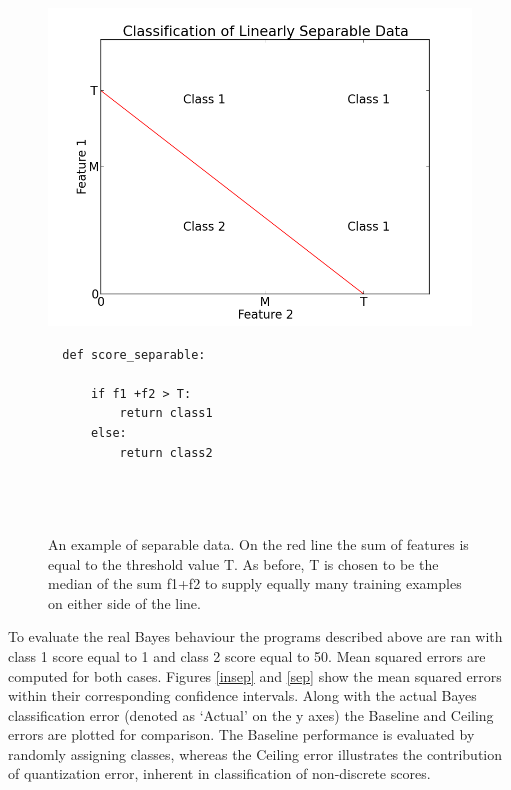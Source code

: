\documentclass[12pt,notitlepage,twoside]{scrreprt}
\begin{document}
\begin{figure}[h!]
\begin{minipage}[b]{0.55\linewidth}
  \includegraphics[width=1.2\linewidth]{figs/gen_sep.png}
\end{minipage}
\hspace{0.5cm}
\begin{minipage}[b]{0.4\linewidth}
\begin{verbatim}
  def score_separable:

      if f1 +f2 > T:
          return class1
      else:
          return class2




\end{verbatim}
\end{minipage}
\caption{An example of separable data. On the red line the sum of features is equal to the
threshold value T.  As before, T is chosen to be the median of the sum f1+f2 to supply
equally many training examples on either side of the line. \label{code:sep}}
\end{figure}

To evaluate the real Bayes behaviour the programs described above are ran with class 1
score equal to 1 and class 2 score equal to 50. Mean squared errors are computed for both cases.
Figures \ref{insep} and \ref{sep} show the mean squared errors within their corresponding
confidence intervals.  Along with the actual Bayes classification error (denoted as
`Actual' on the y axes) the Baseline and Ceiling errors are plotted for comparison. The
Baseline performance is evaluated by randomly assigning classes, whereas the Ceiling error
illustrates the contribution of quantization error, inherent in classification of
non-discrete scores.
\end{document}
